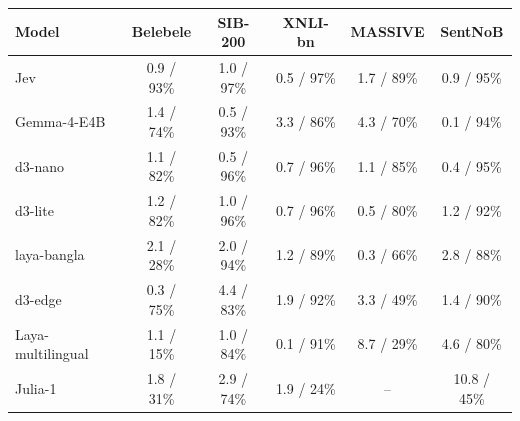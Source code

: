 \begin{tabular}{@{}lccccc@{}}\toprule
Model & Belebele & SIB-200 & XNLI-bn & MASSIVE & SentNoB \\\midrule
Jev & 0.9 / 93\% & 1.0 / 97\% & 0.5 / 97\% & 1.7 / 89\% & 0.9 / 95\% \\
Gemma-4-E4B & 1.4 / 74\% & 0.5 / 93\% & 3.3 / 86\% & 4.3 / 70\% & 0.1 / 94\% \\
d3-nano & 1.1 / 82\% & 0.5 / 96\% & 0.7 / 96\% & 1.1 / 85\% & 0.4 / 95\% \\
d3-lite & 1.2 / 82\% & 1.0 / 96\% & 0.7 / 96\% & 0.5 / 80\% & 1.2 / 92\% \\
laya-bangla & 2.1 / 28\% & 2.0 / 94\% & 1.2 / 89\% & 0.3 / 66\% & 2.8 / 88\% \\
d3-edge & 0.3 / 75\% & 4.4 / 83\% & 1.9 / 92\% & 3.3 / 49\% & 1.4 / 90\% \\
Laya-multilingual & 1.1 / 15\% & 1.0 / 84\% & 0.1 / 91\% & 8.7 / 29\% & 4.6 / 80\% \\
Julia-1 & 1.8 / 31\% & 2.9 / 74\% & 1.9 / 24\% & -- & 10.8 / 45\% \\
\bottomrule\end{tabular}
